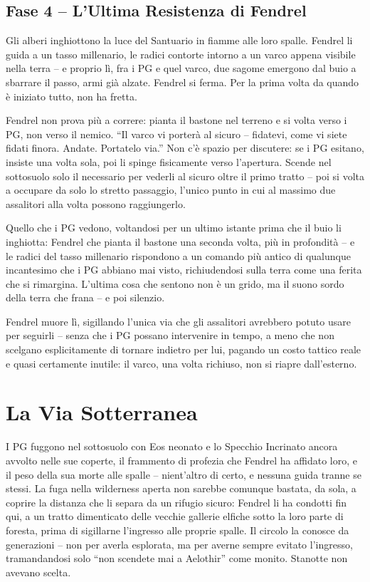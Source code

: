 \subsection{Fase 4 -- L'Ultima Resistenza di Fendrel}

\begin{DndReadAloud}[]
  Gli alberi inghiottono la luce del Santuario in fiamme alle loro spalle. Fendrel li guida a un tasso millenario, le radici contorte intorno a un varco appena visibile nella terra -- e proprio lì, fra i PG e quel varco, due sagome emergono dal buio a sbarrare il passo, armi già alzate. Fendrel si ferma. Per la prima volta da quando è iniziato tutto, non ha fretta.
\end{DndReadAloud}

Fendrel non prova più a correre: pianta il bastone nel terreno e si volta verso i PG, non verso il nemico. ``Il varco vi porterà al sicuro -- fidatevi, come vi siete fidati finora. Andate. Portatelo via.'' Non c'è spazio per discutere: se i PG esitano, insiste una volta sola, poi li spinge fisicamente verso l'apertura. Scende nel sottosuolo solo il necessario per vederli al sicuro oltre il primo tratto -- poi si volta a occupare da solo lo stretto passaggio, l'unico punto in cui al massimo due assalitori alla volta possono raggiungerlo.

Quello che i PG vedono, voltandosi per un ultimo istante prima che il buio li inghiotta: Fendrel che pianta il bastone una seconda volta, più in profondità -- e le radici del tasso millenario rispondono a un comando più antico di qualunque incantesimo che i PG abbiano mai visto, richiudendosi sulla terra come una ferita che si rimargina. L'ultima cosa che sentono non è un grido, ma il suono sordo della terra che frana -- e poi silenzio.

Fendrel muore lì, sigillando l'unica via che gli assalitori avrebbero potuto usare per seguirli -- senza che i PG possano intervenire in tempo, a meno che non scelgano esplicitamente di tornare indietro per lui, pagando un costo tattico reale e quasi certamente inutile: il varco, una volta richiuso, non si riapre dall'esterno.

\section{La Via Sotterranea}

I PG fuggono nel sottosuolo con Eos neonato e lo Specchio Incrinato ancora avvolto nelle sue coperte, il frammento di profezia che Fendrel ha affidato loro, e il peso della sua morte alle spalle -- nient'altro di certo, e nessuna guida tranne se stessi. La fuga nella wilderness aperta non sarebbe comunque bastata, da sola, a coprire la distanza che li separa da un rifugio sicuro: Fendrel li ha condotti fin qui, a un tratto dimenticato delle vecchie gallerie elfiche sotto la loro parte di foresta, prima di sigillarne l'ingresso alle proprie spalle. Il circolo la conosce da generazioni -- non per averla esplorata, ma per averne sempre evitato l'ingresso, tramandandosi solo ``non scendete mai a Aelothir'' come monito. Stanotte non avevano scelta.

